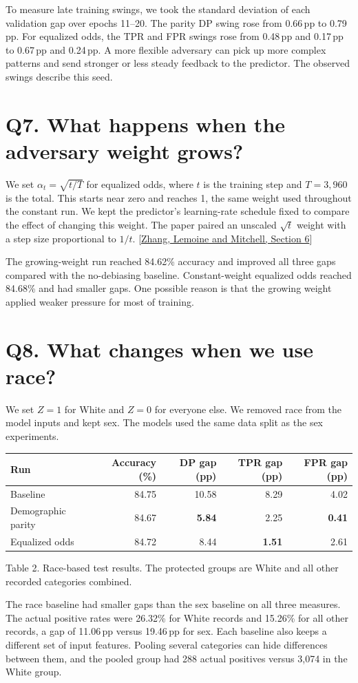 \documentclass[11pt,letterpaper]{article}
\newcommand{\gap}[1]{#1\,pp}
\newcommand{\rate}[1]{#1\%}
\newcommand{\question}[2]{\section*{Q#1. #2}}
\begin{document}
To measure late training swings, we took the standard deviation of each validation gap over epochs 11--20. The parity DP swing rose from \gap{0.66} to \gap{0.79}. For equalized odds, the TPR and FPR swings rose from \gap{0.48} and \gap{0.17} to \gap{0.67} and \gap{0.24}. A more flexible adversary can pick up more complex patterns and send stronger or less steady feedback to the predictor. The observed swings describe this seed.

\question{7}{What happens when the adversary weight grows?}

We set \(\alpha_t=\sqrt{t/T}\) for equalized odds, where \(t\) is the training step and \(T=3{,}960\) is the total. This starts near zero and reaches 1, the same weight used throughout the constant run. We kept the predictor's learning-rate schedule fixed to compare the effect of changing this weight. The paper paired an unscaled \(\sqrt{t}\) weight with a step size proportional to \(1/t\). [\href{https://www.aies-conference.com/2018/contents/papers/main/AIES_2018_paper_162.pdf}{Zhang, Lemoine and Mitchell, Section 6}]

The growing-weight run reached \rate{84.62} accuracy and improved all three gaps compared with the no-debiasing baseline. Constant-weight equalized odds reached \rate{84.68} and had smaller gaps. One possible reason is that the growing weight applied weaker pressure for most of training.

\question{8}{What changes when we use race?}

We set \(Z=1\) for White and \(Z=0\) for everyone else. We removed race from the model inputs and kept sex. The models used the same data split as the sex experiments.

{\small
\begin{tabularx}{\linewidth}{@{}Lrrrr@{}}
\toprule
Run & Accuracy (\%) & DP gap (pp) & TPR gap (pp) & FPR gap (pp)\\
\midrule
Baseline & 84.75 & 10.58 & 8.29 & 4.02\\
Demographic parity & 84.67 & \textbf{5.84} & 2.25 & \textbf{0.41}\\
Equalized odds & 84.72 & 8.44 & \textbf{1.51} & 2.61\\
\bottomrule
\end{tabularx}\par}
{\small\color{muted}Table 2. Race-based test results. The protected groups are White and all other recorded categories combined.\par}

The race baseline had smaller gaps than the sex baseline on all three measures. The actual positive rates were \rate{26.32} for White records and \rate{15.26} for all other records, a gap of \gap{11.06} versus \gap{19.46} for sex. Each baseline also keeps a different set of input features. Pooling several categories can hide differences between them, and the pooled group had 288 actual positives versus 3,074 in the White group.
\end{document}
